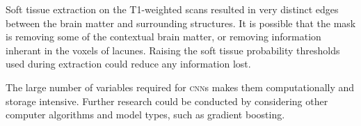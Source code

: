 Soft tissue extraction on the T1-weighted scans resulted in very distinct edges between the brain matter and surrounding structures. It is possible that the mask is removing some of the contextual brain matter, or removing information inherant in the voxels of lacunes. Raising the soft tissue probability thresholds used during extraction could reduce any information lost.

The large number of variables required for \textsc{cnn}s makes them computationally and storage intensive. Further research could be conducted by considering other computer algorithms and model types, such as gradient boosting.

 

%